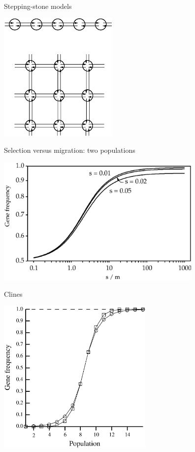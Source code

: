 \documentclass[bluish,slideColor,colorBG,pdf]{prosper}
\begin{document}
\begin{slide}[Replace]{Stepping-stone models}

\centerline{\includegraphics[height=2.5in]{fig4-3.ps}}

\end{slide}

\begin{slide}[Replace]{Selection versus migration: two populations}

\centerline{\includegraphics[height=2.5in]{fig4-4.ps}}

\end{slide}

\begin{slide}[Replace]{Clines}

\centerline{\includegraphics[height=3.0in]{fig4-5.ps}}

\end{slide}
\end{document}
